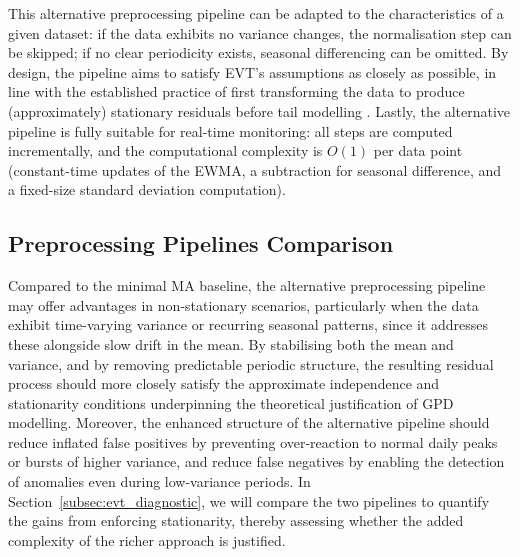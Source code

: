\documentclass{statsmsc}
\begin{document}
This alternative preprocessing pipeline can be adapted to the characteristics of a given dataset: 
if the data exhibits no variance changes, the normalisation step can be skipped; 
if no clear periodicity exists, seasonal differencing can be omitted. 
By design, the pipeline aims to satisfy EVT’s assumptions as closely as possible, 
in line with the established practice of first transforming the data to produce 
(approximately) stationary residuals before tail modelling 
\citep{Mentaschi2016,EastoeTawn2009}. Lastly, the alternative pipeline is fully
suitable for real-time monitoring: all steps are computed incrementally, 
and the computational complexity is $O(1)$ per data point (constant-time updates of the EWMA, 
a subtraction for seasonal difference, and a fixed-size standard deviation computation). 

\subsection{Preprocessing Pipelines Comparison}\label{subsec:ppc}

Compared to the minimal MA baseline, the alternative preprocessing pipeline may offer advantages in 
non-stationary scenarios, particularly when the data exhibit time-varying variance or recurring 
seasonal patterns, since it addresses these alongside slow drift in the mean.
By stabilising both the mean and variance, and by removing predictable periodic structure, 
the resulting residual process should more closely satisfy the approximate independence and 
stationarity conditions underpinning the theoretical justification of GPD modelling. 
Moreover, the enhanced structure of the alternative pipeline should reduce
inflated false positives by preventing over-reaction to normal 
daily peaks or bursts of higher variance, and reduce false negatives by enabling the 
detection of anomalies even during low-variance periods. In Section~\ref{subsec:evt_diagnostic}, 
we will compare the two pipelines to quantify the gains from 
enforcing stationarity, thereby assessing whether the added complexity of the richer approach 
is justified. 
\end{document}

